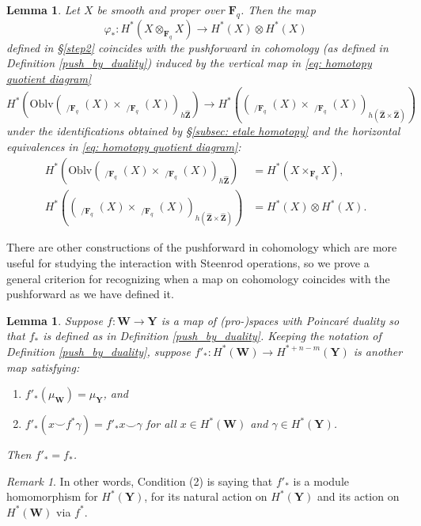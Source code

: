 \documentclass[10pt, reqno]{amsart}
\numberwithin{equation}{subsection}
\newcommand{\F}{\mathbf{F}}
\newcommand{\Z}{\mathbf{Z}}
\newcommand{\wh}[1]{\widehat{#1}}
\newcommand{\mbf}[1]{\mathbf{#1}}
\newcommand{\mrm}[1]{\mathrm{#1}}
\newcommand{\co}{\colon}
\DeclareMathOperator{\et}{\acute{e}t}
\DeclareMathOperator{\Et}{\acute{E}t}
\newtheorem{lemma}[thm]{Lemma}
\theoremstyle{remark}
\newtheorem{remark}[thm]{Remark}
\begin{document}
\begin{lemma}\label{lem: push compatible with Et}
Let $X$ be smooth and proper over $\F_q$. Then the map
\[
\varphi_* \co H^*_{\et}(X \otimes_{\F_q} X) \rightarrow H^*_{\et}(X) \otimes H^*_{\et}(X)
\]
defined in \S \ref{step2} coincides with the pushforward in cohomology  (as defined in Definition \ref{push_by_duality}) induced by the vertical map in \eqref{eq: homotopy quotient diagram}
\[
H^*(\mrm{Oblv}(\Et_{/\F_q}(X) \times \Et_{/\F_q}(X))_{h\wh{\Z}}) \rightarrow  H^* ((\Et_{/\F_q}(X) \times \Et_{/\F_q}(X))_{h(\wh{\Z} \times \wh{\Z})})
\]
 under the identifications obtained by \S \ref{subsec: etale homotopy} and the horizontal equivalences in \eqref{eq: homotopy quotient diagram}:
\begin{align*}
H^*(\mrm{Oblv}(\Et_{/\F_q}(X) \times \Et_{/\F_q}(X))_{h\wh{\Z}}) &= H^*_{\et}(X \times_{\F_q} X) , \\
H^* ((\Et_{/\F_q}(X) \times \Et_{/\F_q}(X))_{h(\wh{\Z} \times \wh{\Z})} )&= H^*_{\et}(X) \otimes H^*_{\et}(X).
\end{align*}
\end{lemma}


There are other constructions of the pushforward in cohomology which are more useful for studying the interaction with Steenrod operations, so we prove a general criterion for recognizing when a map on cohomology coincides with the pushforward as we have defined it. 

\begin{lemma}\label{push_criterion}
Suppose $f \colon \mbf{W} \rightarrow \mbf{Y}$ is a map of (pro-)spaces with Poincar\'{e} duality so that $f_*$ is defined as in Definition \ref{push_by_duality}. Keeping the notation of Definition \ref{push_by_duality}, suppose $f'_* \colon H^*(\mbf{W}) \rightarrow H^{*+n-m}(\mbf{Y})$ is another map satisfying:
\begin{enumerate}
\item $f'_*(\mu_{\mbf{W}}) = \mu_{\mbf{Y}}$, and
\item $f'_*(x \smile f^* \gamma) = f'_* x \smile \gamma $ for all $x \in H^*(\mbf{W})$ and $\gamma \in H^*(\mbf{Y})$. 
\end{enumerate}
Then $f'_* = f_*$.
\end{lemma} 

\begin{remark} In other words, Condition (2) is saying that $f'_*$ is a module homomorphism for $H^*(\mbf{Y})$, for its natural action on $H^*(\mbf{Y})$ and its action on $H^*(\mbf{W})$ via $f^*$.
\end{remark}
\end{document}
